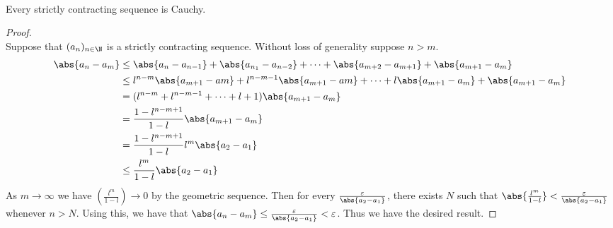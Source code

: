\documentclass[a4paper]{article}
\begin{document}
\begin{prp}{}{}\\ Every strictly contracting sequence is Cauchy. 
\begin{proof}\\ Suppose that $(a_n)_{n\in\N}$ is a strictly contracting sequence. Without loss of generality suppose $n>m$. 
\begin{align*}
\abs{a_n-a_m}&\leq\abs{a_n-a_{n-1}}+\abs{a_{n_1}-a_{n-2}}+\dots+\abs{a_{m+2}-a_{m+1}}+\abs{a_{m+1}-a_m} \\
&\leq l^{n-m}\abs{a_{m+1}-a{m}}+l^{n-m-1}\abs{a_{m+1}-a{m}}+\dots+l\abs{a_{m+1}-a_m}+\abs{a_{m+1}-a_m} \\
&=(l^{n-m}+l^{n-m-1}+\dots+l+1)\abs{a_{m+1}-a_m} \\
&=\frac{1-l^{n-m+1}}{1-l}\abs{a_{m+1}-a_m} \\
&=\frac{1-l^{n-m+1}}{1-l}l^m\abs{a_2-a_1} \\
&\leq\frac{l^m}{1-l}\abs{a_2-a_1}
\end{align*}
As $m\to\infty$ we have $\left(\frac{l^m}{1-l}\right)\to0$ by the geometric sequence. Then for every $\frac{\varepsilon}{\abs{a_2-a_1}}$, there exists $N$ such that $\abs{\frac{l^m}{1-l}}<\frac{\varepsilon}{\abs{a_2-a_1}}$ whenever $n>N$. Using this, we have that $\abs{a_n-a_m}\leq\frac{\varepsilon}{\abs{a_2-a_1}}<\varepsilon$. Thus we have the desired result. 
\end{proof}
\end{prp}
\end{document}
